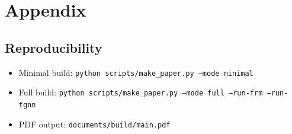 \section{Appendix}

\subsection{Reproducibility}
\begin{itemize}
  \item Minimal build: \texttt{python scripts/make\_paper.py --mode minimal}
  \item Full build: \texttt{python scripts/make\_paper.py --mode full --run-frm --run-tgnn}
  \item PDF output: \texttt{documents/build/main.pdf}
\end{itemize}

